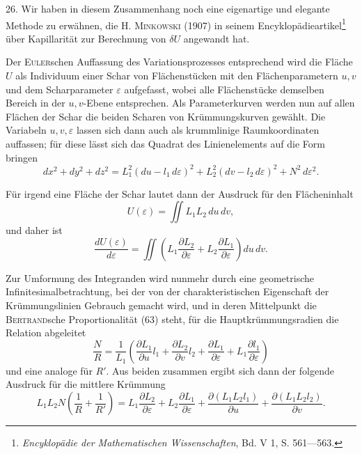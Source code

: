 \clearpage\begingroup\NoSourceHead{}
\renewcommand{\thefootnote}{\arabic{footnote})}\setcounter{footnote}{70}
\noindent\hspace*{\parindent}26. Wir haben in diesem Zusammenhang noch eine eigenartige und
elegante Methode zu erwähnen, die H. \textsc{Minkowski} (1907) in seinem Encyklopädieartikel\footnote{\textit{Encyklopädie der Mathematischen Wissenschaften}, Bd. V 1, S. 561—563.}
über Kapillarität zur Berechnung von $\delta U$ angewandt hat.

Der \textsc{Euler}schen Auffassung des Variationsprozesses entsprechend wird die
Fläche $U$ als Individuum einer Schar von Flächenstücken mit den Flächenparametern
$u,v$ und dem Scharparameter $\varepsilon$ aufgefasst, wobei alle Flächenstücke
demselben Bereich in der $u,v$-Ebene entsprechen. Als Parameterkurven werden
nun auf allen Flächen der Schar die beiden Scharen von Krümmungskurven
gewählt. Die Variabeln $u,v,\varepsilon$ lassen sich dann auch als krummlinige Raumkoordinaten
auffassen; für diese lässt sich das Quadrat des Linienelements
auf die Form bringen
\begin{equation*}\tag{65}
dx^2+dy^2+dz^2=L_1^2(du-l_1\,d\varepsilon)^2+L_2^2(dv-l_2\,d\varepsilon)^2+N^2\,d\varepsilon^2.
\end{equation*}

Für irgend eine Fläche der Schar lautet dann der Ausdruck für den
Flächeninhalt
\[
U(\varepsilon)=\iint L_1 L_2\,du\,dv,
\]
und daher ist
\begin{equation*}\tag{66}
\frac{dU(\varepsilon)}{d\varepsilon}=\iint\left(L_1\frac{\partial L_2}{\partial\varepsilon}+L_2\frac{\partial L_1}{\partial\varepsilon}\right)du\,dv.
\end{equation*}

Zur Umformung des Integranden wird nunmehr durch eine geometrische
Infinitesimalbetrachtung, bei der von der charakteristischen Eigenschaft der
Krümmungslinien Gebrauch gemacht wird, und in deren Mittelpunkt die
\clearpage{}
\noindent \textsc{Bertrand}sche Proportionalität (63) steht, für die Hauptkrümmungsradien die
Relation abgeleitet
\[
\frac{N}{R}=\frac{1}{L_1}\left(\frac{\partial L_1}{\partial u}l_1+\frac{\partial L_2}{\partial v}l_2+\frac{\partial L_1}{\partial\varepsilon}+L_1\frac{\partial l_1}{\partial\varepsilon}\right)
\]
und eine analoge für $R'$. Aus beiden zusammen ergibt sich dann der folgende
Ausdruck für die mittlere Krümmung
\begin{equation*}\tag{67}
L_1 L_2 N\left(\frac{1}{R}+\frac{1}{R'}\right)
=L_1\frac{\partial L_2}{\partial\varepsilon}+L_2\frac{\partial L_1}{\partial\varepsilon}
+\frac{\partial(L_1 L_2 l_1)}{\partial u}+\frac{\partial(L_1 L_2 l_2)}{\partial v}.
\end{equation*}

